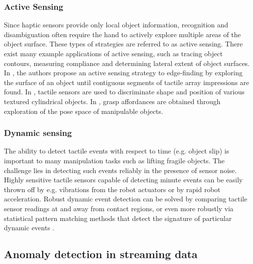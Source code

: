 \subsubsection*{Active Sensing}
Since haptic sensors provide only local object information, recognition and disambiguation often require the hand to actively explore multiple areas of the object surface.
These types of strategies are referred to as active sensing.
There exist many example applications of active sensing, such as tracing object contours, measuring compliance and determining lateral extent of object surfaces.
In \cite{muthukrishnan1987edge}, the authors propose an active sensing strategy to edge-finding by exploring the surface of an object until contiguous segments of tactile array impressions are found.
In \cite{lepora2012embodied}, tactile sensors are used to discriminate shape and position of various textured cylindrical objects.
In \cite{Detry2011}, grasp affordances are obtained through exploration of the pose space of manipulable objects. 

\subsubsection*{Dynamic sensing}

The ability to detect tactile events with respect to time (e.g. object slip) is important to many manipulation tasks such as lifting fragile objects.
The challenge lies in detecting such events reliably in the presence of sensor noise.
Highly sensitive tactile sensors capable of detecting minute events can be easily thrown off by e.g. vibrations from the robot actuators or by rapid robot acceleration.
Robust dynamic event detection can be solved by comparing tactile sensor readings at and away from contact regions, or even more robustly via statistical pattern matching methods that detect the signature of particular dynamic events \cite{tremblay1993estimating}.




\subsection{Anomaly detection in streaming data}

